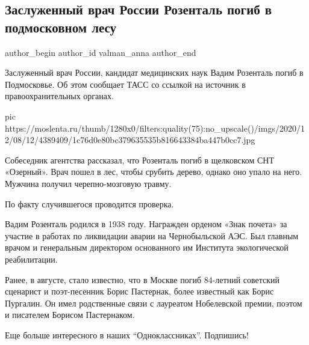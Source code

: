  
 
 
 
 
 
\subsection{Заслуженный врач России Розенталь погиб в подмосковном лесу}
\label{sec:08_12_2020.news.ru.lenta_ru.valman_anna.1.death_vadim_rozental}
\ifcmt
	author_begin
   author_id valman_anna
	author_end
\fi


Заслуженный врач России, кандидат медицинских наук Вадим Розенталь погиб в
Подмосковье. Об этом сообщает ТАСС со ссылкой на источник в правоохранительных
органах.

\ifcmt
pic https://moslenta.ru/thumb/1280x0/filters:quality(75):no_upscale()/imgs/2020/12/08/12/4389409/1c76d0e80bc379635535b816643384ba447b0cc7.jpg
\fi

Собеседник агентства рассказал, что Розенталь погиб в щелковском СНТ «Озерный».
Врач пошел в лес, чтобы срубить дерево, однако оно упало на него. Мужчина
получил черепно-мозговую травму.

По факту случившегося проводится проверка.

Вадим Розенталь родился в 1938 году. Награжден орденом «Знак почета» за участие
в работах по ликвидации аварии на Чернобыльской АЭС. Был главным врачом и
генеральным директором основанного им Института экологической реабилитации.

Ранее, в августе, стало
известно,
что в Москве погиб 84-летний советский сценарист и поэт-песенник Борис
Пастернак, более известный как Борис Пургалин.  Он имел родственные связи с
лауреатом Нобелевской премии, поэтом и писателем Борисом Пастернаком.

Еще больше интересного в наших \enquote{Одноклассниках}. Подпишись!

